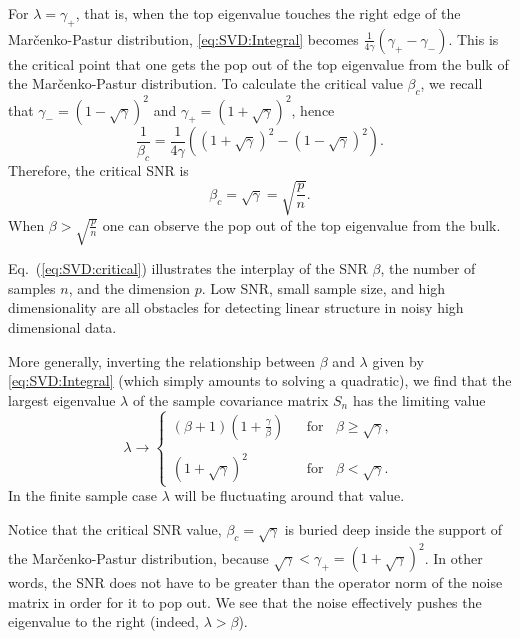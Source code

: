 For $\lambda=\gamma_{+}$, that is, when the top eigenvalue touches the right edge of the Mar\v{c}enko-Pastur distribution,  \eqref{eq:SVD:Integral} becomes $\frac{1}{4 \gamma} (\gamma_{+}-\gamma_{-})$. This is the critical point that one gets the pop out of the top eigenvalue from the bulk of the Mar\v{c}enko-Pastur distribution. To calculate the critical value $\beta_c$, we recall that $\gamma_{-}=(1-\sqrt{\gamma})^2$ and $\gamma_{+}=(1+\sqrt{\gamma})^2$, hence
\begin{equation}
\frac{1}{\beta_c} = \frac{1}{4 \gamma} \left((1+\sqrt{\gamma})^2-(1-\sqrt{\gamma})^2\right).
\end{equation}
Therefore, the critical SNR is
\begin{equation}
\label{eq:SVD:critical}
\beta_{c}= \sqrt{\gamma}=\sqrt{\frac{p}{n}}.
\end{equation}
When $\beta > \sqrt{\frac{p}{n}}$ one can observe the pop out of the top eigenvalue from the bulk.

Eq.~(\ref{eq:SVD:critical}) illustrates the interplay of the SNR $\beta$, the number of samples $n$, and the dimension $p$. Low SNR, small sample size, and high dimensionality are all obstacles for detecting linear structure in noisy high dimensional data.

More generally, inverting the relationship between $\beta$ and $\lambda$ given by \eqref{eq:SVD:Integral} (which simply amounts to solving a quadratic), we find that the largest eigenvalue $\lambda$ of the sample covariance matrix $S_n$ has the limiting value
\begin{equation}
\label{eq:SVD:pop}
\lambda \to \left\{\begin{array}{ccc}
                     (\beta + 1)\left(1 + \frac{\gamma}{\beta} \right) & &  \text{for }\;\; \beta \geq \sqrt{\gamma}, \\
                      &  & \\
                     (1+\sqrt{\gamma})^2 & & \text{for }\;\; \beta < \sqrt{\gamma}.
                   \end{array}
  \right.
\end{equation}
In the finite sample case $\lambda$ will be fluctuating around that value.

Notice that the critical SNR value, $\beta_{c} = \sqrt{\gamma}$ is buried deep inside the support of the Mar\v{c}enko-Pastur distribution, because $\sqrt{\gamma} < \gamma_{+} = (1+\sqrt{\gamma})^2$. In other words, the SNR does not have to be greater than the operator norm of the noise matrix in order for it to pop out. We see that the noise effectively pushes the eigenvalue to the right (indeed, $\lambda > \beta$).


